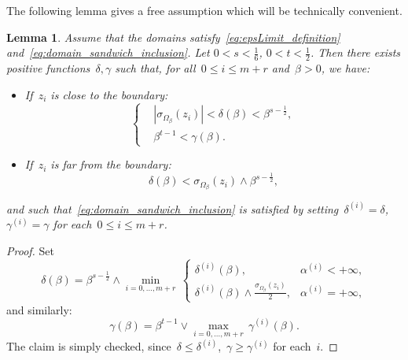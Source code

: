 \documentclass[10pt]{article}
\newcommand{\1}{\mathbbm 1}
\newcommand{\largeRadius}{\delta}
\newcommand{\smallRadius}{\gamma}
\newcommand{\epsLimit}[1]{\alpha^{(#1)}} %
\newcommand{\deltaScalingExp}{s}
\newcommand{\gammaScalingExp}{t}
\newtheorem{lemma}{Lemma}
\begin{document}
    The following lemma gives a free assumption which will be technically convenient.
    \begin{lemma}
        \label{lemma:free_scaling}
        Assume that the domains satisfy~\eqref{eq:epsLimit_definition} and~\eqref{eq:domain_sandwich_inclusion}.
        Let $0<\deltaScalingExp<\frac16$, $0<\gammaScalingExp <\frac12$.
        Then there exists positive functions~$\delta,\gamma$ such that, for all~$0\leq i\leq m+r$ and~$\beta>0$, we have:
        \begin{itemize}
            \item{If~$z_i$ is close to the boundary:
        \begin{equation}
            \tag{\bf H2}
            \label{eq:deltai_polybound_close}
            \left\{\begin{aligned}
            & \left|\sigma_{\Omega_\beta}(z_i)\right| < \largeRadius(\beta) <\beta^{\deltaScalingExp-\frac12},\\
              &\beta^{\gammaScalingExp-1} < \smallRadius(\beta).
            \end{aligned}\right.
        \end{equation}}
        
        \item{If~$z_i$ is far from the boundary:
                \begin{equation}
            \tag{\bf H2'}
            \label{eq:deltai_polybound_far}
            \largeRadius(\beta)<\sigma_{\Omega_\beta}(z_i)\land\beta^{\deltaScalingExp-\frac12},
        \end{equation}}
        \end{itemize}
        and such that~\eqref{eq:domain_sandwich_inclusion} is satisfied by setting~$\largeRadius^{(i)}=\largeRadius$,~$\smallRadius^{(i)}=\smallRadius$ for each~$0\leq i\leq m+r$.
    \end{lemma}
    \begin{proof}
        Set 
        \[\largeRadius(\beta) = \beta^{\deltaScalingExp-\frac12}\land\underset{i=0,\dots,m+r}{\min}\, \begin{cases}
            \largeRadius^{(i)}(\beta),  & \epsLimit{i} < +\infty,\\
            \largeRadius^{(i)}(\beta) \land \frac{\sigma_{\Omega_\beta}(z_i)}{2}, & \epsLimit{i} = +\infty,
        \end{cases}\]
        and similarly:
        \[\smallRadius(\beta) = \beta^{\gammaScalingExp -1} \lor \underset{i=0,\dots,m+r}{\max}\,\smallRadius^{(i)}(\beta).\]
        The claim is simply checked, since~$\largeRadius \leq \largeRadius^{(i)}$,~$\smallRadius \geq\smallRadius^{(i)}$ for each~$i$.
    \end{proof}
\end{document}
